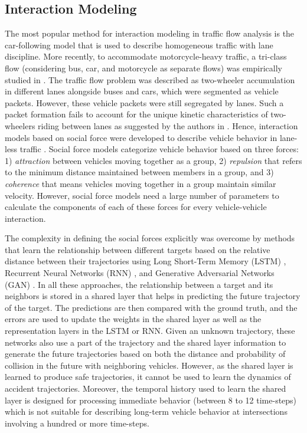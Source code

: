 \documentclass[final,journal]{IEEEtran}
\begin{document}
\subsection{Interaction Modeling}
The most popular method for interaction modeling in traffic flow analysis is the car-following model \cite{car_following} that is used to describe homogeneous traffic with lane discipline. More recently, to accommodate motorcycle-heavy traffic, a tri-class flow (considering bus, car, and motorcycle as separate flows) was empirically studied in \cite{empirical_tri_class}. The traffic flow problem was described as two-wheeler accumulation in different lanes alongside buses and cars, which were segmented as vehicle packets. However, these vehicle packets were still segregated by lanes. Such a packet formation fails to account for the unique kinetic characteristics of two-wheelers riding between lanes as suggested by the authors in \cite{empirical_tri_class}. Hence, interaction models based on social force \cite{original_social_force} were developed to describe vehicle behavior in lane-less traffic \cite{social_mixed, social2d}. Social force models categorize vehicle behavior based on three forces: 1) \textit{attraction} between vehicles moving together as a group, 2) \textit{repulsion} that refers to the minimum distance maintained between members in a group, and 3) \textit{coherence} that means vehicles moving together in a group maintain similar velocity. However, social force models need a large number of parameters to calculate the components of each of these forces for every vehicle-vehicle interaction.

The complexity in defining the social forces explicitly was overcome by methods that learn the relationship between different targets based on the relative distance between their trajectories using Long Short-Term Memory (LSTM) \cite{social_lstm}, Recurrent Neural Networks (RNN) \cite{social_attention}, and Generative Adversarial Networks (GAN) \cite{social_gan}. In all these approaches, the relationship between a target and its neighbors is stored in a shared layer that helps in predicting the future trajectory of the target.  The predictions are then compared with the ground truth, and the errors are used to update the weights in the shared layer as well as the representation layers in the LSTM or RNN. Given an unknown trajectory, these networks also use a part of the trajectory and the shared layer information to generate the future trajectories based on both the distance and probability of collision in the future with neighboring vehicles. However, as the shared layer is learned to produce safe trajectories, it cannot be used to learn the dynamics of accident trajectories. Moreover, the temporal history used to learn the shared layer is designed for processing immediate behavior (between 8 to 12 time-steps) which is not suitable for describing long-term vehicle behavior at intersections involving a hundred or more time-steps. 
\end{document}
